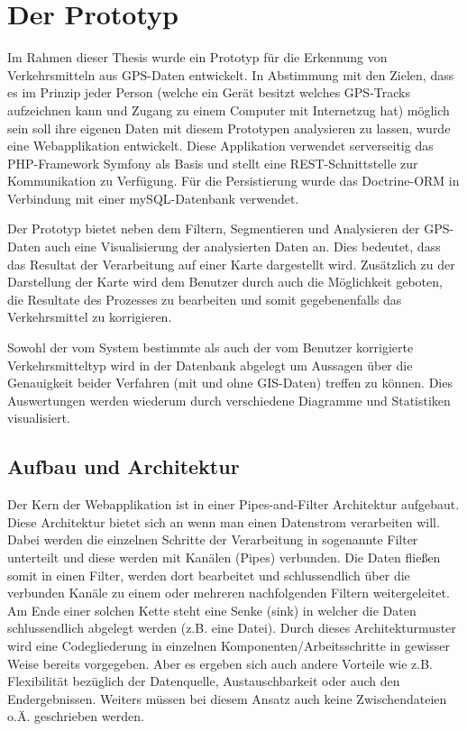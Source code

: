 \chapter{Der Prototyp}

Im Rahmen dieser Thesis  wurde ein Prototyp für die Erkennung von Verkehrsmitteln aus GPS-Daten entwickelt. In Abstimmung mit den Zielen, dass es im Prinzip jeder Person (welche ein Gerät besitzt welches GPS-Tracks aufzeichnen kann und Zugang zu einem Computer mit Internetzug hat) möglich sein soll ihre eigenen Daten mit diesem Prototypen analysieren zu lassen, wurde eine Webapplikation entwickelt. Diese Applikation verwendet serverseitig das PHP-Framework Symfony als Basis und stellt eine REST-Schnittstelle zur Kommunikation zu Verfügung. Für die Persistierung wurde das Doctrine-ORM in Verbindung mit einer mySQL-Datenbank verwendet.

Der Prototyp bietet neben dem Filtern, Segmentieren und Analysieren der GPS-Daten auch eine Visualisierung der analysierten Daten an. Dies bedeutet, dass das Resultat der Verarbeitung auf einer Karte dargestellt wird. Zusätzlich zu der Darstellung der Karte wird dem Benutzer durch auch die Möglichkeit geboten, die Resultate des Prozesses zu bearbeiten und somit gegebenenfalls das Verkehrsmittel zu korrigieren. 

Sowohl der vom System bestimmte als auch der vom Benutzer  korrigierte Verkehrsmitteltyp wird in der Datenbank abgelegt um Aussagen über die Genauigkeit beider Verfahren (mit und ohne GIS-Daten) treffen zu können. Dies Auswertungen werden wiederum durch verschiedene Diagramme und Statistiken visualisiert.
\clearpage

\section{Aufbau und Architektur}
Der Kern der Webapplikation ist in einer Pipes-and-Filter Architektur aufgebaut. Diese Architektur bietet sich an wenn man einen Datenstrom verarbeiten will. Dabei werden die einzelnen Schritte der Verarbeitung in sogenannte Filter unterteilt und diese werden mit Kanälen (Pipes) verbunden. Die Daten fließen somit in einen Filter, werden dort bearbeitet und schlussendlich über die verbunden Kanäle zu einem oder mehreren nachfolgenden Filtern weitergeleitet. Am Ende einer solchen Kette steht eine Senke (sink) in welcher die Daten schlussendlich abgelegt werden (z.B. eine Datei). Durch dieses Architekturmuster wird eine Codegliederung in einzelnen Komponenten/Arbeitsschritte in gewisser Weise bereits vorgegeben. Aber es ergeben sich auch andere Vorteile wie z.B. Flexibilität bezüglich der Datenquelle, Austauschbarkeit oder auch den Endergebnissen. Weiters müssen bei diesem Ansatz auch keine Zwischendateien o.Ä. geschrieben werden. \cite{buschmann_pipes_1998} 

